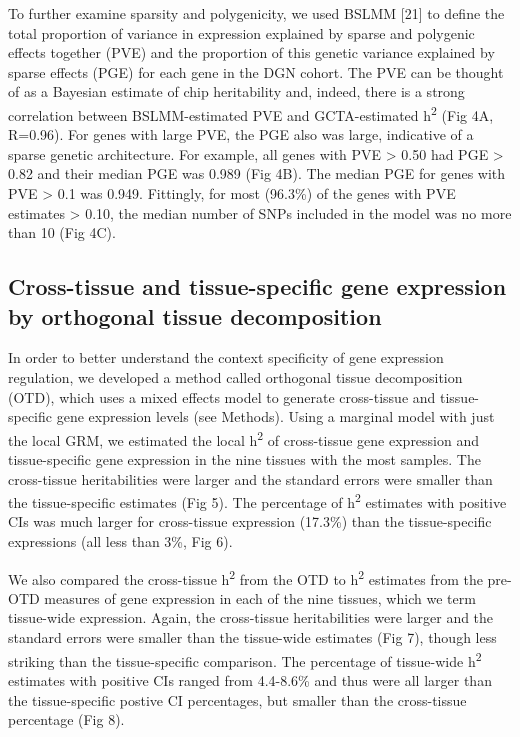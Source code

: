 \documentclass[]{article}
\begin{document}
To further examine sparsity and polygenicity, we used BSLMM {[}21{]} to
define the total proportion of variance in expression explained by
sparse and polygenic effects together (PVE) and the proportion of this
genetic variance explained by sparse effects (PGE) for each gene in the
DGN cohort. The PVE can be thought of as a Bayesian estimate of chip
heritability and, indeed, there is a strong correlation between
BSLMM-estimated PVE and GCTA-estimated h\textsuperscript{2} (Fig 4A,
R=0.96). For genes with large PVE, the PGE also was large, indicative of
a sparse genetic architecture. For example, all genes with PVE
\textgreater{} 0.50 had PGE \textgreater{} 0.82 and their median PGE was
0.989 (Fig 4B). The median PGE for genes with PVE \textgreater{} 0.1 was
0.949. Fittingly, for most (96.3\%) of the genes with PVE estimates
\textgreater{} 0.10, the median number of SNPs included in the model was
no more than 10 (Fig 4C).

\subsection{Cross-tissue and tissue-specific gene expression by
orthogonal tissue
decomposition}\label{cross-tissue-and-tissue-specific-gene-expression-by-orthogonal-tissue-decomposition}

In order to better understand the context specificity of gene expression
regulation, we developed a method called orthogonal tissue decomposition
(OTD), which uses a mixed effects model to generate cross-tissue and
tissue-specific gene expression levels (see Methods). Using a marginal
model with just the local GRM, we estimated the local
h\textsuperscript{2} of cross-tissue gene expression and tissue-specific
gene expression in the nine tissues with the most samples. The
cross-tissue heritabilities were larger and the standard errors were
smaller than the tissue-specific estimates (Fig 5). The percentage of
h\textsuperscript{2} estimates with positive CIs was much larger for
cross-tissue expression (17.3\%) than the tissue-specific expressions
(all less than 3\%, Fig 6).

We also compared the cross-tissue h\textsuperscript{2} from the OTD to
h\textsuperscript{2} estimates from the pre-OTD measures of gene
expression in each of the nine tissues, which we term tissue-wide
expression. Again, the cross-tissue heritabilities were larger and the
standard errors were smaller than the tissue-wide estimates (Fig 7),
though less striking than the tissue-specific comparison. The percentage
of tissue-wide h\textsuperscript{2} estimates with positive CIs ranged
from 4.4-8.6\% and thus were all larger than the tissue-specific postive
CI percentages, but smaller than the cross-tissue percentage (Fig 8).
\end{document}
